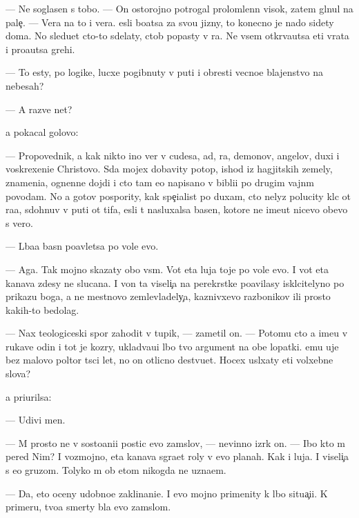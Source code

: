 \documentclass[10pt]{book}
\begin{document}
— Ne soglasen s tobo{\y}. — On ostorojno potrogal prolomlenn{\yi}{\y} visok, zatem gl{\ia}nul na pale{\c}. — Vera na to i vera. {\Y}esli bo{\y}atsa za svo{\y}u jizny, to konecno je nado sidety doma. No sledu{\y}et cto-to sdelaty, ctob{\yi} popasty v ra{\y}. Ne vsem otkr{\yi}va{\y}utsa eti vra\-ta i pro{\x}a{\y}utsa grehi.

— To {\y}esty, po logike, lucxe pogibnuty v puti i obresti vecno{\y}e blajenstvo na nebesah?

— A razve net?

{\Y}a pokacal go\-lo\-vo{\y}:

— Pro\-po\-ved\-nik, {\y}a kak nikto ino{\y} ver{\io} v cudesa, ad, ra{\y}, demonov, angelov, duxi i voskrexeni{\y}e Christovo. S{\io}da mojex dobavity potop, ishod iz hagjitskih zemely, znameni{\y}a, ognenn{\yi}{\y}e dojdi i cto tam {\y}e{\x}o napisano v bibli{\y}i po drugim vajn{\yi}m povodam. No {\y}a gotov pospority, kak spe{\c}ialist po duxam, cto nelyz{\ia} polucity kl{\io}c ot ra{\y}a, sdohnuv v puti ot tifa, {\y}esli t{\yi} nasluxalsa basen, ko\-to\-r{\yi}\-{\y}e ne ime{\y}ut nicevo ob{\x}evo s vero{\y}.

— L{\io}ba{\y}a basn{\ia} po{\y}avl{\ia}{\y}etsa po vole {\Y}evo.

— Aga. Tak mojno skazaty obo vs{\e}m. Vot eta luja toje po vole {\y}evo. I vot eta kanava zdesy ne sluca{\y}na. I von ta viseli{\c}a na perekr{\e}stke po{\y}avilasy iskl{\io}citelyno po prikazu boga, a ne mestnovo zemlevladely{\c}a, kaznivxevo razbo{\y}nikov ili prosto kakih-to bedolag.

— Nax teologiceski{\y} spor zahodit v tupik, — zametil on. — Potomu cto {\y}a ime{\y}u v rukave odin i tot je koz{\yi}ry, uklad{\yi}va{\y}u{\x}i{\y} l{\io}bo{\y} tvo{\y} argument na obe lopatki. {\Y}emu uje bez malovo poltor{\yi} t{\yi}s{\ia}ci let, no on otlicno de{\y}stvu{\y}et. Hocex usl{\yi}xaty eti volxebn{\yi}{\y}e slova?

{\Y}a pri{\x}urilsa:

— Udivi men{\ia}.

— M{\yi} prosto ne v sosto{\y}ani{\y}i postic {\Y}evo zam{\yi}slov, — nevinno izr{\e}k on. — Ibo kto m{\yi} pered Nim? I vozmojno, eta kanava s{\yi}gra{\y}et roly v {\Y}evo planah. Kak i luja. I viseli{\c}a s {\y}e{\y}o gruzom. Tolyko m{\yi} ob etom nikogda ne uzna{\y}em.

— Da, eto oceny udobno{\y}e zaklinani{\y}e. I {\y}evo mojno primenity k l{\io}bo{\y} situa{\c}i{\y}i. K primeru, tvo{\y}a smerty b{\yi}la {\y}evo zam{\yi}slom.
\end{document}
